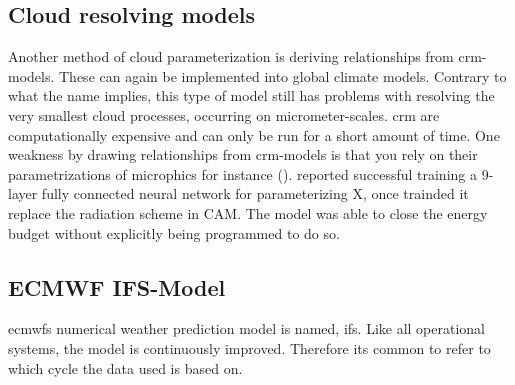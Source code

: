 \subsection{Cloud resolving models} \label{sec:params_climate_models}
Another method of cloud parameterization is deriving relationships from \acrfull{crm}-models. These can again be implemented into global climate models. Contrary to what the name implies, this type of model still has problems with resolving the very smallest cloud processes, occurring on micrometer-scales. 
\acrshort{crm} are computationally expensive and can only be run for a short amount of time. One weakness by drawing  relationships from \acrshort{crm}-models is that you rely on their parametrizations of microphics for instance (\cite{Tomkins2005}).  reported successful training a 9-layer fully connected neural network for parameterizing X, once trainded it replace the radiation scheme in CAM. The model was able to close the energy budget without explicitly being programmed to do so. 


\subsection{ECMWF IFS-Model} \label{sec:era5_param}
\acrfull{ecmwf}s numerical weather prediction model is named, \acrfull{ifs}. Like all operational systems, the model is continuously improved. Therefore its common to refer to which cycle the data used is based on. 

